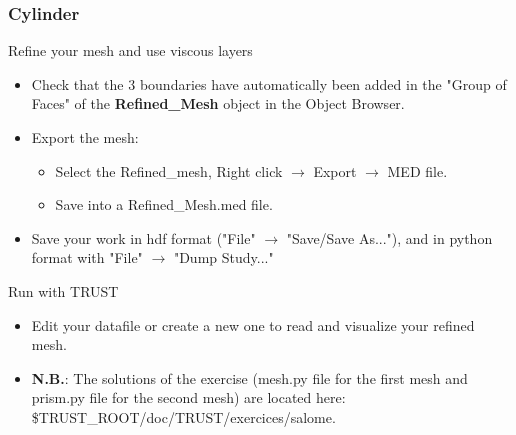 \documentclass[10pt, hyperref={unicode=true,pdfusetitle, bookmarks=true,bookmarksnumbered=false,bookmarksopen=false, breaklinks=false,pdfborder={0 0l 1},backref=true,colorlinks=true,linkcolor=darkblue,pageanchor}]{beamer}
\begin{document}
\begin{frame}
\frametitle{Cylinder}

\begin{block}{Refine your mesh and use viscous layers}
\begin{itemize}
\item Check that the 3 boundaries have automatically been added in the "Group of Faces" of the \textbf{Refined\_Mesh} object in the Object Browser.
\item Export the mesh:
    \begin{itemize}
    \item [$\circ$] Select the Refined\_mesh, Right click $\rightarrow$ Export $\rightarrow$ MED file.
    \item [$\circ$] Save into a Refined\_Mesh.med file.
    \end{itemize}

\item Save your work in hdf format ("File" $\rightarrow$ "Save/Save As..."), and in python format with "File" $\rightarrow$ "Dump Study..."
\end{itemize}
\end{block}


\begin{block}{Run with TRUST}
\begin{itemize}
\item Edit your datafile or create a new one to read and visualize your refined mesh.

\item \textbf{N.B.}: The solutions of the exercise (mesh.py file for the first mesh and prism.py file for the second mesh) are located here: \$TRUST\_ROOT/doc/TRUST/exercices/salome.
\end{itemize}

\end{block}
\end{frame}
\end{document}
